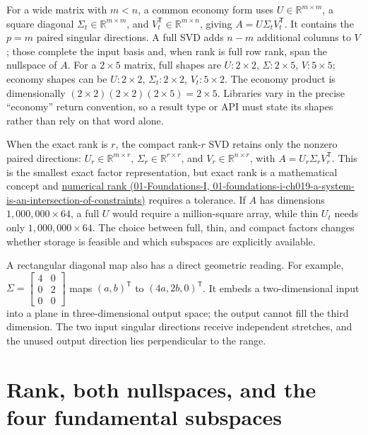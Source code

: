 For a wide matrix with \(m<n\), a common economy form uses \(U\in\mathbb R^{m\times m}\), a square diagonal \(\Sigma_t\in\mathbb R^{m\times m}\), and \(V_t^\mathsf T\in\mathbb R^{m\times n}\), giving \(A=U\Sigma_tV_t^\mathsf T\). It contains the \(p=m\) paired singular directions. A full SVD adds \(n-m\) additional columns to \(V\); those complete the input basis and, when rank is full row rank, span the nullspace of \(A\). For a \(2\times5\) matrix, full shapes are \(U:2\times2\), \(\Sigma:2\times5\), \(V:5\times5\); economy shapes can be \(U:2\times2\), \(\Sigma_t:2\times2\), \(V_t:5\times2\). The economy product is dimensionally \((2\times2)(2\times2)(2\times5)=2\times5\). Libraries vary in the precise ``economy'' return convention, so a result type or API must state its shapes rather than rely on that word alone.

When the exact rank is \(r\), the compact rank-\(r\) SVD retains only the nonzero paired directions: \(U_r\in\mathbb R^{m\times r}\), \(\Sigma_r\in\mathbb R^{r\times r}\), and \(V_r\in\mathbb R^{n\times r}\), with \(A=U_r\Sigma_rV_r^\mathsf T\). This is the smallest exact factor representation, but exact rank is a mathematical concept and \href{../01-Foundations-I/main.pdf\#nameddest=01-foundations-i-ch019-a-system-is-an-intersection-of-constraints}{numerical rank (01-Foundations-I, 01-foundations-i-ch019-a-system-is-an-intersection-of-constraints)} requires a tolerance. If \(A\) has dimensions \(1{,}000{,}000\times64\), a full \(U\) would require a million-square array, while thin \(U_t\) needs only \(1{,}000{,}000\times64\). The choice between full, thin, and compact factors changes whether storage is feasible and which subspaces are explicitly available.

A rectangular diagonal map also has a direct geometric reading. For example, \(\Sigma=\begin{bmatrix}4&0\\0&2\\0&0\end{bmatrix}\) maps \((a,b)^\mathsf T\) to \((4a,2b,0)^\mathsf T\). It embeds a two-dimensional input into a plane in three-dimensional output space; the output cannot fill the third dimension. The two input singular directions receive independent stretches, and the unused output direction lies perpendicular to the range.

\section{Rank, both nullspaces, and the four fundamental subspaces}\label{02-foundations-ii-ch024-rank-both-nullspaces-and-the-four-fundamental-subspaces}

